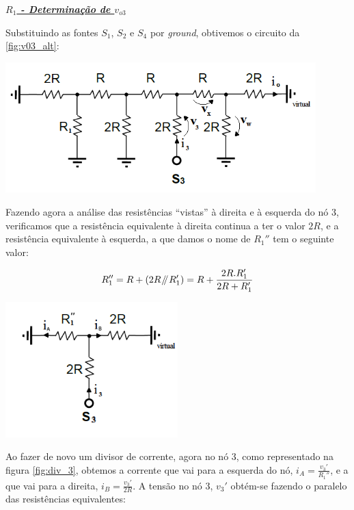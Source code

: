 \documentclass[a4paper,11pt]{report}
\newcommand{\parallelsum}{\mathbin{\!/\mkern-5mu/\!}} %
\begin{document}
\par

\large\underline{\textit{\textbf{$R_1$ - Determinação de $v_{o3}$}}}\\
\par

Substituindo as fontes $S_1$, $S_2$ e $S_4$ por \textit{ground}, obtivemos o circuito da \ref{fig:v03_alt}:

\begin{center}
     \includegraphics[angle=0,width=0.9\textwidth]{v03_alt.png}
     \label{fig:v03_alt}
     \end{center}
     
Fazendo agora a análise das resistências ``vistas'' à direita e à esquerda do nó 3, verificamos que a resistência equivalente à direita continua a ter o valor $2R$, e a resistência equivalente à esquerda, a que damos o nome de $R_1''$ tem o seguinte valor:

$$R_1''=R+\left(2R\parallelsum R_1'\right)=R+\frac{2R.R_1'}{2R+R_1'}$$

\begin{center}
     \includegraphics[angle=0,width=0.5\textwidth]{div_3.png}
     \label{fig:div_3}
     \end{center}

Ao fazer de novo um divisor de corrente, agora no nó 3, como representado na figura \ref{fig:div_3}, obtemos a corrente que vai para a esquerda do nó, $i_A=\frac{v_3'}{R_1''}$, e a que vai para a direita, $i_B=\frac{v_3'}{2R}$. A tensão no nó 3, $v_3'$ obtém-se fazendo o paralelo das resistências equivalentes:
\end{document}
